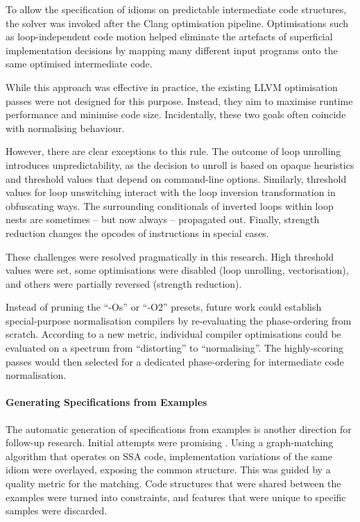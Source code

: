     To allow the specification of idioms on predictable intermediate code
    structures, the solver was invoked after the Clang optimisation pipeline.
    Optimisations such as loop-independent code motion helped eliminate the
    artefacts of superficial implementation decisions by mapping many different
    input programs onto the same optimised intermediate code.

    While this approach was effective in practice, the existing LLVM
    optimisation passes were not designed for this purpose.
    Instead, they aim to maximise runtime performance and minimise code size.
    Incidentally, these two goals often coincide with normalising behaviour.

    However, there are clear exceptions to this rule.
    The outcome of loop unrolling introduces unpredictability, as the decision
    to unroll is based on opaque heuristics and threshold values that depend
    on command-line options.
    Similarly, threshold values for loop unswitching interact with the loop
    inversion transformation in obfuscating ways.
    The surrounding conditionals of inverted loops within loop nests are
    sometimes -- but now always -- propagated out.
    Finally, strength reduction changes the opcodes of instructions in special
    cases.

    These challenges were resolved pragmatically in this research.
    High threshold values were set, some optimisations were disabled
    (loop unrolling, vectorisation), and others were partially reversed
    (strength reduction).

    Instead of pruning the ``-Os'' or ``-O2'' presets, future work could
    establish special-purpose normalisation compilers by re-evaluating the
    phase-ordering from scratch.
    According to a new metric, individual compiler optimisations could be
    evaluated on a spectrum from ``distorting'' to ``normalising''.
    The highly-scoring passes would then selected for a dedicated
    phase-ordering for intermediate code normalisation.

    \paragraph*{Generating Specifications from Examples}
    The automatic generation of specifications from examples is another
    direction for follow-up research.
    Initial attempts were promising \citep{DBLP:conf/IEEEpact/CollieGO19}.
    Using a graph-matching algorithm that operates on SSA code, implementation
    variations of the same idiom were overlayed, exposing the common structure.
    This was guided by a quality metric for the matching.
    Code structures that were shared between the examples were turned into
    constraints, and features that were unique to specific samples were
    discarded.


